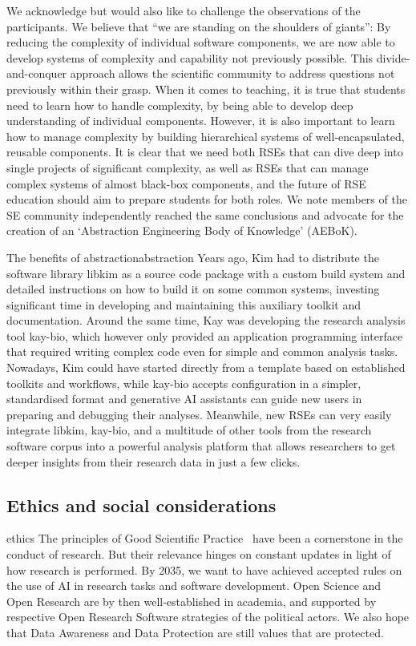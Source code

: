 \documentclass{eceasst}
\begin{document}
We acknowledge but would also like to challenge the observations of the participants.
We believe that ``we are standing on the shoulders of giants'':
By reducing the complexity of individual software components,
we are now able to develop systems of complexity and capability not previously possible.
This divide-and-conquer approach allows the scientific community to address questions not previously within their grasp.
When it comes to teaching, it is true that students need to learn how to handle complexity,
by being able to develop deep understanding of individual components.
However, it is also important to learn how to manage complexity
by building hierarchical systems of well-encapsulated, reusable components.
It is clear that we need both RSEs that can dive deep into single projects of significant complexity,
as well as RSEs that can manage complex systems of almost black-box components,
and the future of RSE education should aim to prepare students for both roles.
We note members of the SE community independently reached the same conclusions
and advocate for the creation of an `Abstraction Engineering Body of Knowledge'
(AEBoK)\cite{Bencomo2024AEBoK}.

\begin{story}{The benefits of abstraction}{abstraction}
Years ago, Kim had to distribute the software library libkim as a source code package
with a custom build system and detailed instructions on how to build it on some common systems,
investing significant time in developing and maintaining this auxiliary toolkit and documentation.
Around the same time, Kay was developing the research analysis tool kay-bio,
which however only provided an application programming interface that
required writing complex code even for simple and common analysis tasks.
Nowadays, Kim could have started directly from a template based on established toolkits and workflows,
while kay-bio accepts configuration in a simpler, standardised format and generative AI assistants
can guide new users in preparing and debugging their analyses.
Meanwhile, new RSEs can very easily integrate libkim, kay-bio, and a multitude
of other tools from the research software corpus into a powerful analysis
platform that allows researchers to get deeper insights from their research data
in just a few clicks.
\end{story}

\subsection{Ethics and social considerations}
\begin{whatis}{}{ethics}
The principles of Good Scientific Practice~\cite{dfg_gsp} have been a cornerstone in the conduct of research.
But their relevance hinges on constant updates in light of how research is performed.
By 2035, we want to have achieved accepted rules on the use of AI in research tasks and software development.
Open Science and Open Research are by then well-established in academia, and supported by respective Open Research Software
strategies of the political actors. We also hope that Data Awareness and Data Protection are still values
that are protected.
\end{whatis}
\end{document}
